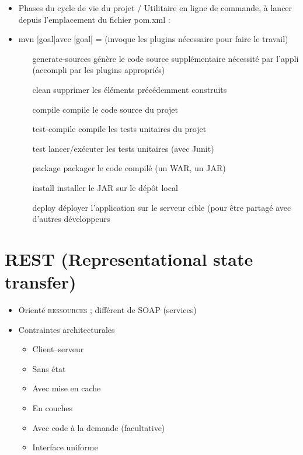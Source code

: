 \documentclass[11pt,twoside,a4paper]{article}
\begin{document}
\begin{landscape}
\begin{multicols}{2}
\begin{itemize}
\begin{itemize}
\begin{itemize}
			\end{itemize}
		\end{itemize}
		\item[] 
		\item Phases du cycle de vie du projet / Utilitaire en ligne de commande, {\`a} lancer depuis l'emplacement du fichier pom.xml : 
		\item mvn [goal]avec [goal] = (invoque les plugins n{\'e}cessaire pour faire le travail)
		\begin{itemize}
			\item[generate-sources] g{\'e}n{\`e}re le code source suppl{\'e}mentaire n{\'e}cessit{\'e} par l'appli (accompli par les plugins appropri{\'e}s)
			\item[clean] supprimer les {\'e}l{\'e}ments pr{\'e}c{\'e}demment construits
			\item[compile] compile le code source du projet
			\item[test-compile] compile les tests unitaires du projet
			\item[test] lancer/ex{\'e}cuter les tests unitaires (avec Junit)
			\item[package] packager le code compil{\'e} (un WAR, un JAR)
			\item[install] installer le JAR sur le d{\'e}p{\^o}t local
			\item[deploy] d{\'e}ployer l'application sur le serveur cible (pour {\^e}tre partag{\'e} avec d'autres d{\'e}veloppeurs
		\end{itemize}
	\end{itemize}
	
	\vfill
	
	\columnbreak

	\section*{REST (Representational state transfer)}
	\begin{itemize}
		\item Orient{\'e} \textsc{ressources} ; diff{\'e}rent de SOAP (services)
		\item Contraintes architecturales
		\begin{itemize}
			\item Client–serveur
			\item Sans {\'e}tat
			\item Avec mise en cache
			\item En couches
			\item Avec code {\`a} la demande (facultative)
			\item Interface uniforme
		\end{itemize}
		

\end{itemize}
\end{multicols}
\end{landscape}
\end{document}
